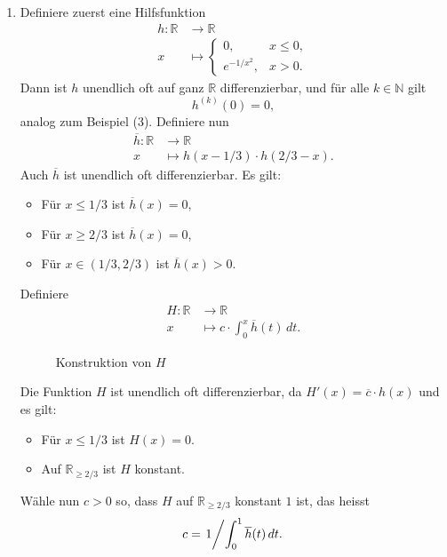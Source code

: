 \documentclass[../main.tex]{subfiles}
\begin{document}
\begin{examples}
\begin{enumerate}[(1)]
    \item Definiere zuerst eine Hilfsfunktion
      \begin{align*}
        h \colon \mathbb{R} & \to \mathbb{R} \\
        x & \mapsto 
        \begin{cases}
          0, & x \leq 0,\\
          e^{-1/x^2}, & x > 0.
        \end{cases}
      \end{align*}
      Dann ist $h$ unendlich oft auf ganz $\mathbb{R}$ 
      differenzierbar, und für alle $k \in \mathbb{N}$ 
      gilt 
      \[
      h^{(k)}(0) = 0,
      \]
      analog zum Beispiel (3).
      Definiere nun
      \begin{align*}
        \overline h \colon \mathbb{R} & \to \mathbb{R} \\
        x & \mapsto h(x - 1/3) \cdot h(2/3 - x).
      \end{align*}
      Auch $\overline h$ ist unendlich oft differenzierbar.
      Es gilt:
      \begin{itemize}
        \item Für $x \leq 1/3$ ist $\overline h(x) = 0$,
        \item Für $x \geq 2/3$ ist $\overline h(x) = 0$,
        \item Für $x \in (1/3, 2/3)$ ist $\overline h(x) > 0$.
      \end{itemize}
      Definiere
      \begin{align*}
        H \colon \mathbb{R} & \to \mathbb{R} \\
        x & \mapsto 
        c \cdot 
        \int_{0}^{x} \overline h(t) \, dt.
      \end{align*}
      
      \begin{figure}[htb] 
        \centering
        \begin{minipage}{0.50\textwidth}
          \centering
          
        \end{minipage}%
        \begin{minipage}{0.50\textwidth}
          \centering
          
        \end{minipage}%
        \caption{Konstruktion von $H$}%
        \label{fig:partition}
      \end{figure}

      Die Funktion $H$ ist unendlich oft differenzierbar,
      da $H'(x) = \overline c \cdot h(x)$ und es gilt:
       \begin{itemize}
         \item Für $x \leq 1/3$ ist $H(x) = 0$.
         \item Auf $\mathbb{R}_{\geq 2/3}$ ist $H$ konstant.
      \end{itemize}
      Wähle nun $c > 0$ so, dass $H$ 
      auf $\mathbb{R}_{\geq 2/3}$ konstant $1$ ist,
      das heisst
      \[
        c = \left. 1 \middle/ \int_{0}^{1} \overline h(t) \, dt.\right.
      \]
      

\end{enumerate}
\end{examples}
\end{document}

